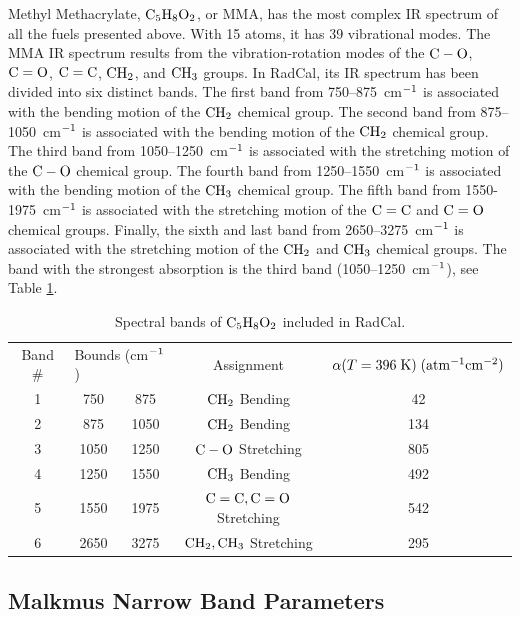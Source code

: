 Methyl Methacrylate, $\rm C_5H_8O_2$, or MMA, has the most complex IR spectrum of all the fuels presented above. With 15 atoms, it has 39 vibrational modes. The MMA IR spectrum results from the vibration-rotation modes of the $\rm C-O$, $\rm C=O$, $\rm C=C$, $\rm CH_2$, and $\rm CH_3$ groups. In RadCal, its IR spectrum has been divided into six distinct bands. The first band from 750--875~cm$\rm^{-1}$ is associated with the bending motion of the $\rm CH_2$ chemical group. The second band from 875--1050~cm$\rm^{-1}$ is associated with the bending motion of the $\rm CH_2$ chemical group. The third band from 1050--1250~cm$\rm^{-1}$ is associated with the stretching motion of the $\rm C-O$ chemical group. The fourth band from 1250--1550~cm$\rm^{-1}$ is associated with the bending motion of the $\rm CH_3$ chemical group. The fifth band from 1550-1975~cm$\rm^{-1}$ is associated with the stretching motion of the $\rm C=C$ and $\rm C=O$ chemical groups. Finally, the sixth and last band from 2650--3275~cm$\rm^{-1}$ is associated with the stretching motion of the $\rm CH_2$ and $\rm CH_3$ chemical groups. The band with the strongest absorption is the third band (1050--1250~cm$\rm^{-1}$), see Table \ref{Table::C5H8O2}.
\begin{table}[ht]
   \centering
   \caption{Spectral bands of $\rm C_5H_8O_2$ included in RadCal.}
   \vspace{0.1in}
   \label{Table::C5H8O2}
    \begin{tabular}{|c|c|c|c|c|}
    \hline
    Band \# & \multicolumn{2}{|l|}{Bounds (cm$\rm ^{-1}$) } & Assignment &  $\alpha(T=396 \; {\rm K}) \; (\rm {atm^{-1} cm^{-2}})$ \\
    \cline{1-5}
    1 & 750  & 875  & $\rm CH_2$ Bending          & 42   \\
    2 & 875  & 1050 & $\rm CH_2$ Bending          & 134  \\
    3 & 1050 & 1250 & $\rm C-O$ Stretching        & 805  \\
    4 & 1250 & 1550 & $\rm CH_3$ Bending          & 492  \\
    5 & 1550 & 1975 & $\rm C=C, C=O$ Stretching   & 542  \\
    6 & 2650 & 3275 & $\rm CH_2, CH_3$ Stretching & 295  \\
    \hline
   \end{tabular}
\end{table}

\subsection{Malkmus Narrow Band Parameters}

